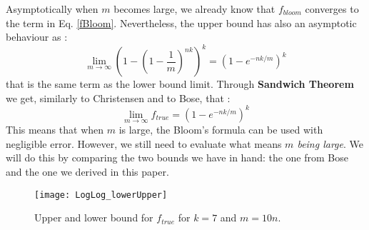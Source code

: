 
Asymptotically when $m$ becomes large, we already know that $f_{bloom}$ converges to the term in Eq. \ref{fBloom}. Nevertheless, the upper bound has also an asymptotic behaviour as :
\begin{equation}
\label{flim}
\lim\limits_{m \to \infty} \left(1-\left(1-\frac{1}{m}\right)^{nk}\right)^k = \left(1-e^{-nk/m}\right)^k 
\end{equation}
that is the same term as the lower bound limit. Through \textbf{Sandwich Theorem} we get, similarly to Christensen and to Bose, that :
\begin{equation}
\label{flimtrue}
\lim\limits_{m \to \infty}  f_{true} =  \left(1-e^{-nk/m}\right)^k 
\end{equation}
This means that when $m$ is large, the Bloom's formula can be used with negligible error. However, we still need to evaluate what means \textit{$m$ being large}. We will do this by comparing the two bounds we have in hand: the one from Bose and the one we derived in this paper. 

\begin{figure}
\centering
\texttt{[image: LogLog\_lowerUpper]}
\caption{Upper and lower bound for $f_{true}$ for $k=7$ and $m=10n$.}
\label{fig:uplowbound}
\end{figure}

